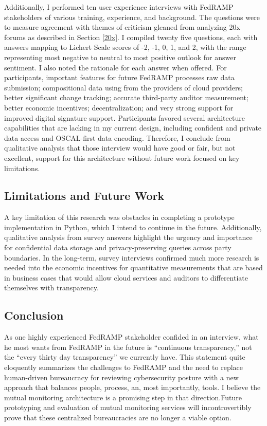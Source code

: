 \documentclass{jdf}
\begin{document}
Additionally, I performed ten user experience interviews with FedRAMP stakeholders of various training, experience, and background. The questions were to measure agreement with themes of criticism gleaned from analyzing 20x forums as described in Section \ref{20x}. I compiled twenty five questions, each with answers mapping to Lichert Scale scores of -2, -1, 0, 1, and 2, with the range representing most negative to neutral to most positive outlook for answer sentiment. I also noted the rationale for each answer when offered. For participants, important features for future FedRAMP processes raw data submission; compositional data using from the providers of cloud providers; better significant change tracking; accurate third-party auditor measurement; better economic incentives; decentralization; and very strong support for improved digital signature support. Participants favored several architecture capabilities that are lacking in my current design, including confident and private data access and OSCAL-first data encoding. Therefore, I conclude from qualitative analysis that those interview would have good or fair, but not excellent, support for this architecture without future work focused on key limitations.

\subsection{Limitations and Future Work}

A key limitation of this research was obstacles in completing a prototype implementation in Python, which I intend to continue in the future. Additionally, qualitative analysis from survey answers highlight the urgency and importance for confidential data storage and privacy-preserving queries across party boundaries. In the long-term, survey interviews confirmed much more research is needed into the economic incentives for quantitative measurements that are based in business cases that would allow cloud services and auditors to differentiate themselves with transparency.

\subsection{Conclusion}

As one highly experienced FedRAMP stakeholder confided in an interview, what he most wants from FedRAMP in the future is ``continuous transparency,'' not the ``every thirty day transparency'' we currently have. This statement quite eloquently summarizes the challenges to FedRAMP and the need to replace human-driven bureaucracy for reviewing cybersecurity posture with a new approach that balances people, process, an, most importantly, tools. I believe the mutual monitoring architecture is a promising step in that direction.Future prototyping and evaluation of mutual monitoring services will incontrovertibly prove that these centralized bureaucracies are no longer a viable option.
\end{document}
